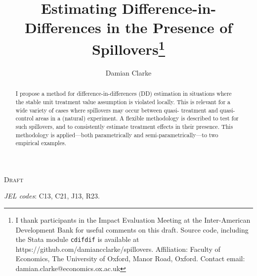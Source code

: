 \documentclass{article}
\title{Estimating Difference-in-Differences in the Presence of Spillovers\footnote{
I thank participants in the Impact Evaluation Meeting at the Inter-American 
Development Bank for useful comments on this draft. Source code, including the
Stata module \texttt{cdifdif} is available at 
https://github.com/damiancclarke/spillovers.  Affiliation: Faculty of Economics, 
The University of Oxford, Manor Road, Oxford. Contact email: 
damian.clarke@economics.ox.ac.uk}}
\author{Damian Clarke}
\begin{document}
\maketitle

\begin{center}
{\Large\textsc{Draft}}
\end{center}

\begin{abstract}
I propose a method for difference-in-differences (DD) estimation in situations 
where the stable unit treatment value assumption is violated locally. This is
relevant for a wide variety of cases where spillovers may occur between quasi-%
treatment and quasi-control areas in a (natural) experiment. A flexible 
methodology is described to test for such spillovers, and to consistently 
estimate treatment effects in their presence. This methodology is applied---both 
parametrically and semi-parametrically---to two empirical examples.
\end{abstract}
\hspace{8mm} \emph{JEL codes}: C13, C21, J13, R23. \\
\end{document}
